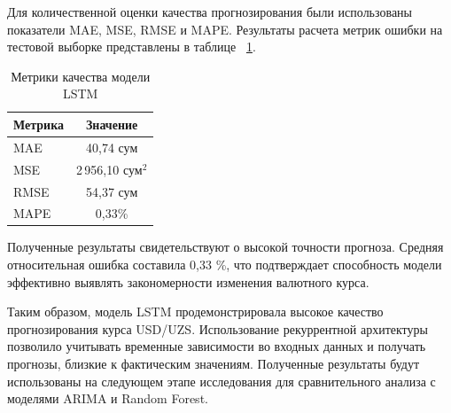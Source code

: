 Для количественной оценки качества прогнозирования были использованы показатели MAE, MSE, RMSE и MAPE. Результаты расчета метрик ошибки на тестовой выборке представлены в таблице ~\ref{tab:lstm_metrics}.
\begin{table}[h!]
\centering
\caption{Метрики качества модели LSTM}
\label{tab:lstm_metrics}
\begin{tabular}{|l|c|}
\hline
\textbf{Метрика} & \textbf{Значение} \\ \hline
MAE  & 40{,}74 сум \\ \hline
MSE  & 2\,956{,}10 сум$^2$ \\ \hline
RMSE & 54{,}37 сум \\ \hline
MAPE & 0{,}33\% \\ \hline
\end{tabular}
\end{table}

Полученные результаты свидетельствуют о высокой точности прогноза. Средняя относительная ошибка составила 0,33 \%, что подтверждает способность модели эффективно выявлять закономерности изменения валютного курса.

Таким образом, модель LSTM продемонстрировала высокое качество прогнозирования курса USD/UZS. Использование рекуррентной архитектуры позволило учитывать временные зависимости во входных данных и получать прогнозы, близкие к фактическим значениям. Полученные результаты будут использованы на следующем этапе исследования для сравнительного анализа с моделями ARIMA и Random Forest.

